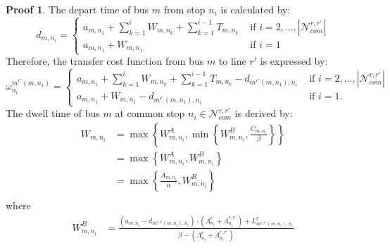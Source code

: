 \documentclass[fleqn]{article}
\newcounter{proof}
\theoremstyle{definition} \newtheorem*{myproof}{Proof}
\begin{document}
\begin{myproof}
    
    The depart time of bus $m$ from stop $n_{i}$ is calculated by:
    \begin{equation}
        \label{equ:d_com}
        d_{m,n_{i}} = 
        \begin{cases}
            a_{m,n_{1}} + \sum\limits_{k=1}^{i} W_{m,n_{k}} + \sum\limits_{k=1}^{i-1} T_{m,n_{k}} &\text{ if } i=2,...,\left|\mathcal{N}_{com}^{r,r'}\right|\\
            a_{m,n_{1}}+W_{m,n_{1}} &\text{ if } i=1
        \end{cases}
    \end{equation}
    Therefore, the transfer cost function from bus $m$ to line $r'$ is expressed by:
    \begin{equation}
        \omega_{n_i}^{m^{r'}\left(m,n_{1}\right)}=  
        \begin{cases}
            a_{m,n_{1}} + \sum\limits_{k=1}^{i} W_{m,n_{k}} + \sum\limits_{k=1}^{i-1} T_{m,n_{k}}-d_{m^{r'}\left(m,n_{1}\right),n_{i}}
            &\text{ if }i=2,...,\left|\mathcal{N}_{com}^{r,r'}\right|\\
            a_{m,n_{1}} + W_{m,n_{1}}-d_{m^{r'}\left(m,n_{1}\right),n_{i}}
            &\text{ if }i=1.
        \end{cases}
    \end{equation}    
    The dwell time of bus $m$ at common stop $n_{i}\in\mathcal{N}_{com}^{r,r'}$ is derived by:
    \begin{equation}
        \label{equ:W_com}
        \begin{split}
            W_{m,n_{i}} &= \max \left\{W_{m,n_{i}}^{A},\min \left\{W_{m,n_{i}}^{B},\frac{C_{m,n_{i}}}{\beta}\right\}\right\}\\
            & = \max \left\{W_{m,n_{i}}^{A},W_{m,n_{i}}^{B} \right\}\\
            & = \max \left\{\frac{A_{m,n_{i}}}{\alpha},W_{m,n_{i}}^{B} \right\}\\
        \end{split}
    \end{equation}
    where %
    \begin{equation}
        \begin{split}
            W_{m,n_{i}}^{B} &= \frac{\left(a_{m,n_{i}}-d_{m^{r,r'}(m,n_{i}),n_{i}}\right)\cdot \left(\Lambda_{n_{i}}^{r}+\Lambda_{n_{i}}^{r,r'}\right)
            +L_{m^{r,r'}(m,n_{i}),n_{i}}^{r}}
            {\beta-\left(\Lambda_{n_{i}}^{r}+\Lambda_{n_{i}}^{r,r'}\right)}\\

\end{split}
\end{equation}
\end{myproof}
\end{document}
